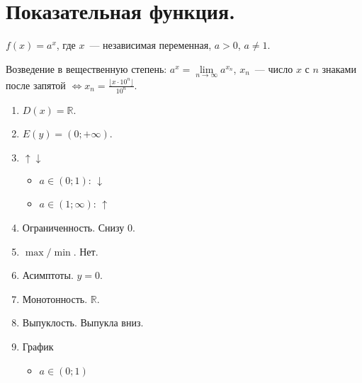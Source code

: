 \documentclass[12pt]{article}
\begin{document}
	\section{Показательная функция.}
	\begin{definition}
		$f(x) = a^x$, где $x$~--- независимая переменная, $a > 0$, $a \not= 1$.
	\end{definition}
	\begin{definition}
		Возведение в вещественную степень: $a^x = \lim\limits_{n \rightarrow \infty} a^{x_n}$, $x_n$~--- число $x$ с $n$ знаками после запятой $\Leftrightarrow x_n = \frac{\lfloor x \cdot 10^n \rfloor}{10^n}$.
	\end{definition}
	\begin{property}
		\begin{enumerate}
			\item $D(x) = \mathbb{R}$.
			\item $E(y) = (0; +\infty)$.
			\item $\uparrow \downarrow$
			\begin{itemize}
				\item $a \in (0; 1)$: $\downarrow$
				\item $a \in (1; \infty)$: $\uparrow$
			\end{itemize}
			\item Ограниченность. Снизу $0$.
			\item $\max/\min$. Нет.
			\item Асимптоты. $y = 0$.
			\item Монотонность. $\mathbb{R}$.
			\item Выпуклость. Выпукла вниз.
			\item График
			\begin{itemize}
				\item $a \in (0; 1)$
				\begin{figure}[H]

\end{figure}
\end{itemize}
\end{enumerate}
\end{property}
\end{document}
